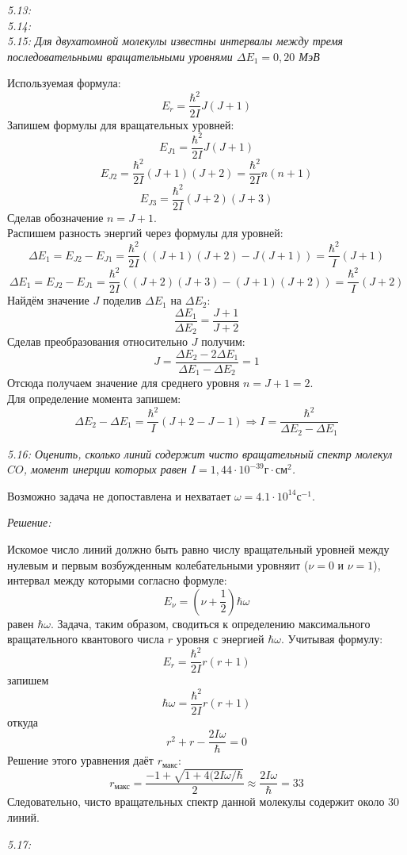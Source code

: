 	\emph{5.13: } \\

	\emph{5.14: } \\

	\emph{5.15: Для двухатомной молекулы известны интервалы между 
        тремя последовательными вращательными уровнями \( \Delta E_1 = 
        0,20 \) МэВ }
        
		Используемая формула: \[ E_r = \frac{\hbar^2}{2I}J(J+1) \]
		Запишем формулы для вращательных уровней:
		\[ E_{J1} = \frac{\hbar^2}{2I}J(J+1) \]
		\[ E_{J2} = \frac{\hbar^2}{2I}(J+1)(J+2) = \frac{\hbar^2}{2I}n(n+1) \]
		\[ E_{J3} = \frac{\hbar^2}{2I}(J+2)(J+3) \]
		Сделав обозначение \( n = J + 1 \). \\
		Распишем разность энергий через формулы для уровней:
		\[ 
			\Delta E_1 = E_{J2} - E_{J1} = 
			\frac{\hbar^2}{2I}((J+1)(J+2) - J(J+1)) = \frac{\hbar^2}{I}(J+1) 
		\]
		\[ 
			\Delta E_1 = E_{J2} - E_{J1} =
			\frac{\hbar^2}{2I}((J+2)(J+3)-(J+1)(J+2)) = \frac{\hbar^2}{I}(J+2)
		\]
		Найдём значение \( J \) поделив \( \Delta E_1 \) на \( \Delta E_2 \):
		\[ \frac{\Delta E_1}{\Delta E_2} = \frac{J+1}{J+2} \]
		Сделав преобразования относительно \( J \) получим:
		\[ J = \frac{\Delta E_2 - 2\Delta E_1}{\Delta E_1 - \Delta E_2} = 1 \]
		Отсюда получаем значение для среднего уровня \( n = J+1 = 2 \). \\
		Для определение момента запишем: 
		\[ 
			\Delta E_2 - \Delta E_1 = \frac{\hbar^2}{I}(J+2-J-1) 
			\Rightarrow I = \frac{\hbar^2}{\Delta E_2 - \Delta E_1}
		\]

	\emph{5.16: Оценить, сколько линий содержит чисто вращательный 
        спектр молекул \( CO \), момент инерции которых равен 
        \( I = 1,44\cdot10^{-39} \text{г}\cdot\text{см}^2 \).}

        Возможно задача не допоставлена и нехватает
        \( \omega = 4.1\cdot10^{14} \text{с}^{-1} \). 

        \emph{Решение:}

        Искомое число линий должно быть равно числу вращательный уровней 
        между нулевым и первым возбужденным колебательными уровняит 
        (\( \nu = 0 \) и \( \nu = 1 \)), интервал между которыми согласно 
        формуле: 
        \[ E_\nu = (\nu + \frac{1}{2})\hbar\omega \]
        равен \( \hbar\omega \). Задача, таким образом, сводиться к 
        определению максимального вращательного квантового числа \( r \) 
        уровня с энергией \( \hbar\omega \). Учитывая формулу:
        \[ E_r = \frac{\hbar^2}{2I}r(r+1) \]
        запишем 
        \[ \hbar\omega = \frac{\hbar^2}{2I}r(r+1) \]
        откуда 
        \[ r^2 + r - \frac{2I\omega}{\hbar} = 0 \]
        Решение этого уравнения даёт \( r_{\text{макс}} \):
        \[ 
            r_\text{макс} = \frac{-1 + 
            \sqrt{1+4(2I\omega/\hbar}}{2} \approx 
            \frac{2I\omega}{\hbar} = 33
        \]
        Следовательно, чисто вращательных спектр данной молекулы 
        содержит около 30 линий.

	\emph{5.17: } \\